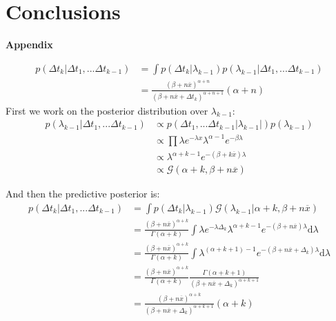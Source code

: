 \documentclass[9pt,technote]{IEEEtran}
\begin{document}
\section{Conclusions}

\newpage
\appendix
\noindent \textbf{\Large Appendix}
\vspace{-0.1cm}

\begin{align}
p(\Delta t_k | \Delta t_1,...\Delta t_{k-1})
&=
\int p(\Delta t_k | \lambda_{k-1})
p(\lambda_{k-1} |\Delta t_1,...\Delta t_{k-1})\\
&=\frac{(\beta + n\overline{x})^{\alpha+n}}{(\beta + n\overline{x}+\Delta t_k)^{\alpha+n+1}}(\alpha+n)
\end{align}
First we work on the posterior distribution over $\lambda_{k-1}$:
\begin{align}
p(\lambda_{k-1} |\Delta t_1,...\Delta t_{k-1})
&\propto
p(\Delta t_1,...\Delta t_{k-1} | \lambda_{k-1} |)p(\lambda_{k-1})\\
&\propto 
\prod \lambda e^{-\lambda x}  \lambda^{\alpha-1}e^{-\beta \lambda}\\
&\propto
\lambda^{\alpha+k-1}
e^{-(\beta+k\overline{x})\lambda}\\
&\propto\mathcal{G}(\alpha+k, \beta + n\overline{x})
\end{align}

And then the predictive posterior is:
\begin{align}
p(\Delta t_k | \Delta t_1,...\Delta t_{k-1})&=
\int
p(\Delta t_k | \lambda_{k-1})
\mathcal{G}(\lambda_{k-1} | \alpha+k, \beta + n\overline{x})\\
&=
\frac{(\beta+n\overline{x})^{\alpha+k}}{\Gamma(\alpha+k)}
\int
\lambda e^{-\lambda \Delta_k}
\lambda^{\alpha+k-1}
e^{-(\beta+n\overline{x})\lambda}
\text{d}\lambda\\
&=
\frac{(\beta+n\overline{x})^{\alpha+k}}{\Gamma(\alpha+k)}
\int
\lambda^{(\alpha+k+1)-1}
e^{-(\beta+n\overline{x}+\Delta_k)\lambda}
\text{d}\lambda\\
&=
\frac{(\beta+n\overline{x})^{\alpha+k}}{\Gamma(\alpha+k)}
\frac{\Gamma(\alpha+k+1)}{(\beta+n\overline{x}+\Delta_k)^{\alpha+k+1}}\\
&=
\frac
{(\beta+n\overline{x})^{\alpha+k}}{(\beta+n\overline{x}+\Delta_k)^{\alpha+k+1}}
(\alpha+k)
\end{align}


 
% 
% 

\end{document}
